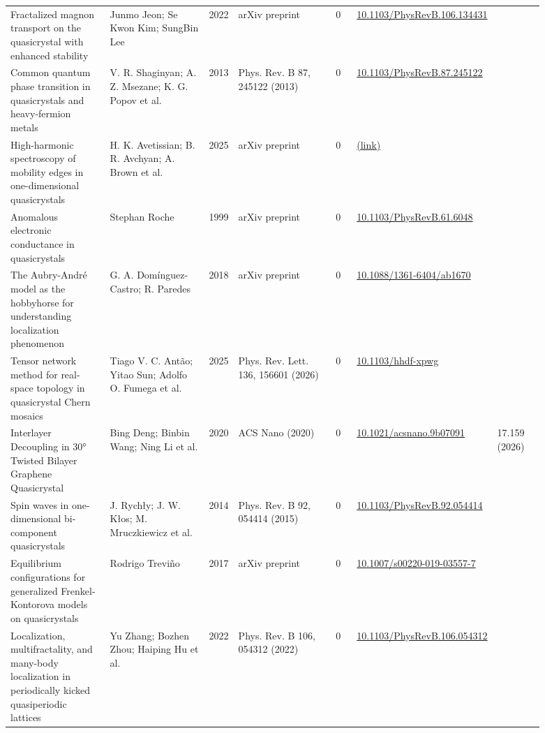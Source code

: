 \documentclass[10pt,a4paper]{article}
\begin{document}
{\begin{longtable}{p{0.192\linewidth}p{0.192\linewidth}p{0.043\linewidth}p{0.192\linewidth}p{0.043\linewidth}p{0.132\linewidth}p{0.096\linewidth}}
Fractalized magnon transport on the quasicrystal with enhanced stability & Junmo Jeon; Se Kwon Kim; SungBin Lee & 2022 & arXiv preprint & 0 & \href{https://doi.org/10.1103/PhysRevB.106.134431}{10.1103/PhysRevB.106.134431} &  \\
Common quantum phase transition in quasicrystals and heavy-fermion metals & V. R. Shaginyan; A. Z. Msezane; K. G. Popov et al. & 2013 & Phys. Rev. B 87, 245122 (2013) & 0 & \href{https://doi.org/10.1103/PhysRevB.87.245122}{10.1103/PhysRevB.87.245122} &  \\
High-harmonic spectroscopy of mobility edges in one-dimensional quasicrystals & H. K. Avetissian; B. R. Avchyan; A. Brown et al. & 2025 & arXiv preprint & 0 & \href{http://arxiv.org/abs/2509.06647v2}{(link)} &  \\
Anomalous electronic conductance in quasicrystals & Stephan Roche & 1999 & arXiv preprint & 0 & \href{https://doi.org/10.1103/PhysRevB.61.6048}{10.1103/PhysRevB.61.6048} &  \\
The Aubry-André model as the hobbyhorse for understanding localization phenomenon & G. A. Domínguez-Castro; R. Paredes & 2018 & arXiv preprint & 0 & \href{https://doi.org/10.1088/1361-6404/ab1670}{10.1088/1361-6404/ab1670} &  \\
Tensor network method for real-space topology in quasicrystal Chern mosaics & Tiago V. C. Antão; Yitao Sun; Adolfo O. Fumega et al. & 2025 & Phys. Rev. Lett. 136, 156601 (2026) & 0 & \href{https://doi.org/10.1103/hhdf-xpwg}{10.1103/hhdf-xpwg} &  \\
Interlayer Decoupling in 30° Twisted Bilayer Graphene Quasicrystal & Bing Deng; Binbin Wang; Ning Li et al. & 2020 & ACS Nano (2020) & 0 & \href{https://doi.org/10.1021/acsnano.9b07091}{10.1021/acsnano.9b07091} & 17.159 (2026) \\
Spin waves in one-dimensional bi-component quasicrystals & J. Rychły; J. W. Kłos; M. Mruczkiewicz et al. & 2014 & Phys. Rev. B 92, 054414 (2015) & 0 & \href{https://doi.org/10.1103/PhysRevB.92.054414}{10.1103/PhysRevB.92.054414} &  \\
Equilibrium configurations for generalized Frenkel-Kontorova models on quasicrystals & Rodrigo Treviño & 2017 & arXiv preprint & 0 & \href{https://doi.org/10.1007/s00220-019-03557-7}{10.1007/s00220-019-03557-7} &  \\
Localization, multifractality, and many-body localization in periodically kicked quasiperiodic lattices & Yu Zhang; Bozhen Zhou; Haiping Hu et al. & 2022 & Phys. Rev. B 106, 054312 (2022) & 0 & \href{https://doi.org/10.1103/PhysRevB.106.054312}{10.1103/PhysRevB.106.054312} &  \\

\end{longtable}}
\end{document}
